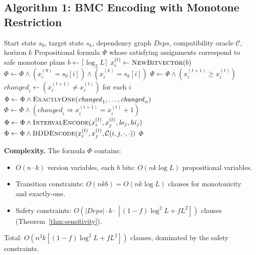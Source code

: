 \documentclass[10pt,twocolumn]{article}
\begin{document}
\subsection{Algorithm 1: BMC Encoding with Monotone Restriction}
\label{sec:alg-bmc}

\begin{algorithm}[t]
\caption{\textsc{EncodeBMC}: Monotone BMC encoding of deployment plan existence}
\label{alg:bmc}
\begin{algorithmic}[1]
\Require Start state $s_0$, target state $s_k$, dependency graph $\mathit{Deps}$, compatibility oracle $\mathcal{C}$, horizon $k$
\Ensure Propositional formula $\Phi$ whose satisfying assignments correspond to safe monotone plans
\State $b \gets \lceil \log_2 L \rceil$ 
  \State $x_i^{(t)} \gets \textsc{NewBitvector}(b)$ 
\EndFor
\State {}
  \State $\Phi \gets \Phi \wedge (x_i^{(0)} = s_0[i]) \wedge (x_i^{(k)} = s_k[i])$
\EndFor
\State {}
    \State $\Phi \gets \Phi \wedge (x_i^{(t+1)} \geq x_i^{(t)})$ 
  \EndFor
  \State $\mathit{changed}_i \gets (x_i^{(t+1)} \neq x_i^{(t)})$ for each $i$
  \State $\Phi \gets \Phi \wedge \textsc{ExactlyOne}(\mathit{changed}_1, \ldots, \mathit{changed}_n)$
    \State $\Phi \gets \Phi \wedge (\mathit{changed}_i \Rightarrow x_i^{(t+1)} = x_i^{(t)} + 1)$ 
  \EndFor
\EndFor
\State {}
      \State $\Phi \gets \Phi \wedge \textsc{IntervalEncode}(x_i^{(t)}, x_j^{(t)}, \mathit{lo}_j, \mathit{hi}_j)$ 
    \Else
      \State $\Phi \gets \Phi \wedge \textsc{BDDEncode}(x_i^{(t)}, x_j^{(t)}, \mathcal{C}(i,j,\cdot,\cdot))$
    \EndIf
  \EndFor
\EndFor
\State \Return $\Phi$
\end{algorithmic}
\end{algorithm}

\textbf{Complexity.} The formula $\Phi$ contains:
\begin{itemize}
\item $O(n \cdot k)$ version variables, each $b$ bits: $O(n k \log L)$ propositional variables.
\item Transition constraints: $O(n k b) = O(nk \log L)$ clauses for monotonicity and exactly-one.
\item Safety constraints: $O(|\mathit{Deps}| \cdot k \cdot [(1-f) \log^2 L + f L^2])$ clauses (Theorem~\ref{thm:sensitivity}).
\end{itemize}
Total: $O(n^2 k [(1-f) \log^2 L + f L^2])$ clauses, dominated by the safety constraints.
\end{document}
